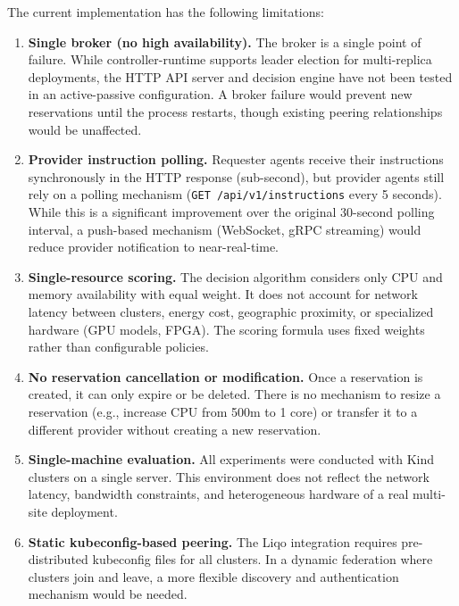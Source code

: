 The current implementation has the following limitations:

\begin{enumerate}
    \item \textbf{Single broker (no high availability).} The broker is a single point of failure. While controller-runtime supports leader election for multi-replica deployments, the HTTP API server and decision engine have not been tested in an active-passive configuration. A broker failure would prevent new reservations until the process restarts, though existing peering relationships would be unaffected.

    \item \textbf{Provider instruction polling.} Requester agents receive their instructions synchronously in the HTTP response (sub-second), but provider agents still rely on a polling mechanism (\texttt{GET /api/v1/instructions} every 5 seconds). While this is a significant improvement over the original 30-second polling interval, a push-based mechanism (WebSocket, gRPC streaming) would reduce provider notification to near-real-time.

    \item \textbf{Single-resource scoring.} The decision algorithm considers only CPU and memory availability with equal weight. It does not account for network latency between clusters, energy cost, geographic proximity, or specialized hardware (GPU models, FPGA). The scoring formula uses fixed weights rather than configurable policies.

    \item \textbf{No reservation cancellation or modification.} Once a reservation is created, it can only expire or be deleted. There is no mechanism to resize a reservation (e.g., increase CPU from 500m to 1 core) or transfer it to a different provider without creating a new reservation.

    \item \textbf{Single-machine evaluation.} All experiments were conducted with Kind clusters on a single server. This environment does not reflect the network latency, bandwidth constraints, and heterogeneous hardware of a real multi-site deployment.

    \item \textbf{Static kubeconfig-based peering.} The Liqo integration requires pre-distributed kubeconfig files for all clusters. In a dynamic federation where clusters join and leave, a more flexible discovery and authentication mechanism would be needed.
\end{enumerate}


